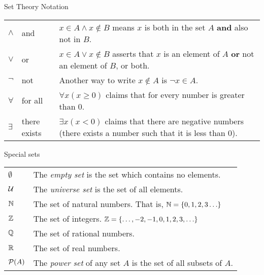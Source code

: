 \documentclass[12pt]{article}
\begin{document}
\begin{defbox}{Set Theory Notation}
\begin{tabular}{p{.75in} p{1.35in} p{3.15in}}
    $\wedge$ & and & $x \in A \wedge x \notin B$ means $x$ is both in the set $A$ \textbf{and} also not in $B$. \\[1ex]
    $\vee$ & or & $x \in A \vee x \notin B$ asserts that $x$ is an element of $A$ \textbf{or} not an element of $B$, or both. \\[1ex]
    $\neg$ & not & Another way to write $x \notin A$ is $\neg x \in A$.\\[1ex]
    $\forall$ & for all & $\forall x (x \ge 0)$ claims that for every number is greater than 0. \\[1ex]
    $\exists$ & there exists & $\exists x (x < 0)$ claims that there are negative numbers (there exists a number such that it is less than 0). \\[1ex]
  \end{tabular}

\end{defbox}

\begin{defbox}{Special sets}

\begin{tabular}{l p{5in}}
  $\emptyset$ & The \emph{empty set} is the set which contains no elements.\\[1ex]
  $\mathcal U$ & The \emph{universe set} is the set of all elements.\\[1ex]
$\mathbb N$ & The set of natural numbers. That is, $\mathbb N = \{0, 1, 2, 3\ldots\}$ \\[1ex]
$\mathbb Z$ & The set of integers.  $\mathbb Z = \{\ldots, -2, -1, 0, 1, 2, 3, \ldots\}$\\[1ex]
$\mathbb Q$ & The set of rational numbers.\\[1ex]
$\mathbb R$ & The set of real numbers.\\[1ex]
$\mathcal P(A)$ & The \emph{power set} of any set $A$ is the set of all subsets of $A$.
\end{tabular}
\end{defbox}
\end{document}
